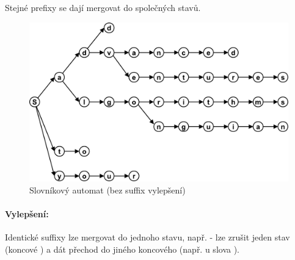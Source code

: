 Stejné prefixy se dají mergovat do společných stavů.

\begin{figure}[h]
    \begin{center}
        \includegraphics[width=120mm]{spolecne/04/images/slovnikovy-automat}
    \end{center}
    \caption{Slovníkový automat (bez suffix vylepšení)}
\end{figure}

\paragraph{Vylepšení:} Identické suffixy lze mergovat do jednoho stavu, např.  - lze zrušit jeden stav (koncové ) a dát přechod do jiného koncového  (např. u slova ).